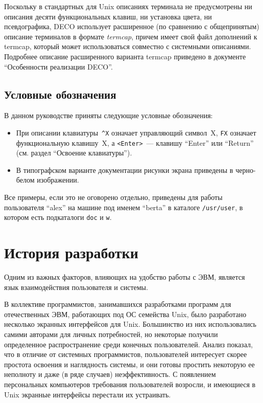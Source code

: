 Поскольку в стандартных для Unix описаниях терминала не предусмотрены
ни описания десяти функциональных клавиш, ни установка цвета, ни
псевдографика, DECO использует расширенное (по сравнению с общепринятым)
описание терминалов в формате {\em termcap},
причем имеет свой файл дополнений к termcap,
который может использоваться совместно с системными описаниями.
Подробнее описание расширенного варианта termcap приведено в
документе ``Особенности реализации DECO''.

\subsection{Условные обозначения}

В данном руководстве приняты следующие условные обозначения:

\begin{itemize}
\item
При описании клавиатуры~{\tt \^{}X} означает управляющий символ~X,
{\tt FX} означает функциональную клавишу~X, а {\tt <Enter>}~--- клавишу
``Enter'' или ``Return'' (см. раздел ``Освоение клавиатуры'').
\item
В типографском варианте документации рисунки экрана приведены в
черно-белом изображении.
\end{itemize}

Все примеры, если это не оговорено отдельно, приведены для работы
пользователя ``alex'' на машине под именем ``berta'' в
каталоге {\tt /usr/user}, в котором есть подкаталоги {\tt doc} и {\tt w}.

\section{История разработки}


Одним из важных факторов, влияющих на удобство работы с ЭВМ,
является язык взаимодействия пользователя и системы.

В коллективе программистов, занимавшихся разработками программ для
отечественных ЭВМ, работающих под ОС семейства Unix,
было разработано несколько экранных интерфейсов для Unix. Большинство
из них использовались самими авторами для личных потребностей, но некоторые
получили определенное распространение среди конечных пользователей.
Анализ показал, что в отличие от системных программистов, пользователей
интересует скорее простота освоения и наглядность системы, и они готовы
простить некоторую ее неполноту и даже (в ряде случаев) неэффективность.
С появлением персональных компьютеров требования пользователей возросли,
и имеющиеся в Unix экранные интерфейсы перестали их устраивать.

